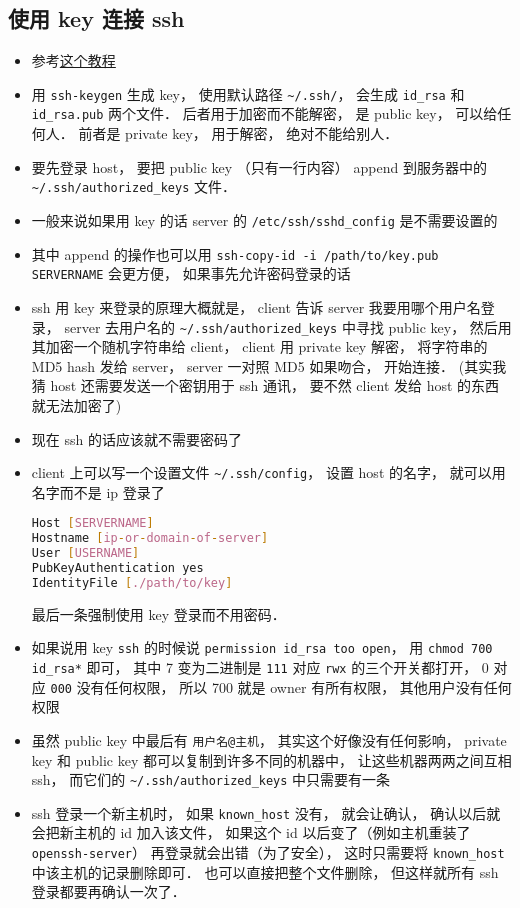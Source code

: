 \subsection{使用 key 连接 ssh}
\begin{itemize}
\item 参考\href{https://www.digitalocean.com/community/tutorials/ssh-essentials-working-with-ssh-servers-clients-and-keys}{这个教程}
\item 用 \verb`ssh-keygen` 生成 key， 使用默认路径 \verb`~/.ssh/`， 会生成 \verb`id_rsa` 和 \verb`id_rsa.pub` 两个文件． 后者用于加密而不能解密， 是 public key， 可以给任何人． 前者是 private key， 用于解密， 绝对不能给别人．
\item 要先登录 host， 要把 public key （只有一行内容） append 到服务器中的 \verb`~/.ssh/authorized_keys` 文件．
\item 一般来说如果用 key 的话 server 的 \verb`/etc/ssh/sshd_config` 是不需要设置的
\item 其中 append 的操作也可以用 \verb`ssh-copy-id -i /path/to/key.pub SERVERNAME` 会更方便， 如果事先允许密码登录的话
\item ssh 用 key 来登录的原理大概就是， client 告诉 server 我要用哪个用户名登录， server 去用户名的 \verb`~/.ssh/authorized_keys` 中寻找 public key， 然后用其加密一个随机字符串给 client， client 用 private key 解密， 将字符串的 MD5 hash 发给 server， server 一对照 MD5 如果吻合， 开始连接．  (其实我猜 host 还需要发送一个密钥用于 ssh 通讯， 要不然 client 发给 host 的东西就无法加密了)
\item 现在 ssh 的话应该就不需要密码了
\item client 上可以写一个设置文件 \verb`~/.ssh/config`， 设置 host 的名字， 就可以用名字而不是 ip 登录了
\begin{lstlisting}[language=bash]
Host [SERVERNAME]
Hostname [ip-or-domain-of-server]
User [USERNAME]
PubKeyAuthentication yes
IdentityFile [./path/to/key]
\end{lstlisting}
最后一条强制使用 key 登录而不用密码．

\item 如果说用 key \verb`ssh` 的时候说 \verb`permission id_rsa too open`， 用 \verb`chmod 700 id_rsa*` 即可， 其中 7 变为二进制是 \verb`111` 对应 \verb`rwx` 的三个开关都打开， 0 对应 \verb`000` 没有任何权限， 所以 700 就是 owner 有所有权限， 其他用户没有任何权限
\item 虽然 public key 中最后有 \verb`用户名@主机`， 其实这个好像没有任何影响， private key 和 public key 都可以复制到许多不同的机器中， 让这些机器两两之间互相 ssh， 而它们的 \verb`~/.ssh/authorized_keys` 中只需要有一条
\item ssh 登录一个新主机时， 如果 \verb`known_host` 没有， 就会让确认， 确认以后就会把新主机的 id 加入该文件， 如果这个 id 以后变了（例如主机重装了 \verb`openssh-server`） 再登录就会出错（为了安全）， 这时只需要将 \verb`known_host` 中该主机的记录删除即可． 也可以直接把整个文件删除， 但这样就所有 ssh 登录都要再确认一次了．
\end{itemize}


